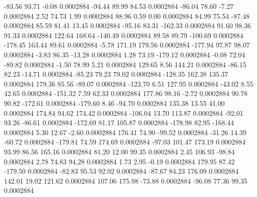       -83.56       93.71       -0.08     0.0002884
      -94.44       89.99       84.53     0.0002884
      -86.04       78.60       -7.27     0.0002884
        2.52       74.73        1.99     0.0002884
       88.96        0.59        0.00     0.0002884
       84.99       75.54      -87.48     0.0002884
       85.59       81.41       13.45     0.0002884
      -95.16       83.31     -162.33     0.0002884
       91.60       98.36       91.33     0.0002884
      122.64      168.64     -140.49     0.0002884
       89.58       89.79     -100.69     0.0002884
     -178.45      163.44       89.61     0.0002884
       -5.78      171.19      179.56     0.0002884
     -177.94       97.87       98.07     0.0002884
       -3.83       86.35      -13.28     0.0002884
        1.28       73.19     -179.12     0.0002884
       -0.08       72.04      -89.82     0.0002884
       -1.50       78.99        5.21     0.0002884
      129.65        8.56      144.21     0.0002884
      -86.15       82.23      -14.71     0.0002884
      -85.23       79.23       79.02     0.0002884
     -128.35      162.38      135.37     0.0002884
      179.36       85.56      -89.07     0.0002884
     -123.70        6.51      127.95     0.0002884
      -43.02        8.55       42.65     0.0002884
     -151.32        7.59       62.33     0.0002884
      177.86       98.16       -2.72     0.0002884
       90.78       90.82     -172.61     0.0002884
     -179.60        8.46      -94.70     0.0002884
      135.38       13.55       41.00     0.0002884
      174.84       94.62      174.42     0.0002884
     -106.04       13.70      113.87     0.0002884
      -92.01       93.26      -86.61     0.0002884
     -172.69       81.17      105.87     0.0002884
     -178.98       82.95     -168.44     0.0002884
        5.30       12.67       -2.60     0.0002884
      176.41       74.90      -99.52     0.0002884
      -31.26       14.39      -60.72     0.0002884
     -179.81       74.59      174.69     0.0002884
      -97.03      101.47      173.19     0.0002884
       93.99       86.56      165.16     0.0002884
       81.20       12.00       99.35     0.0002884
        2.45      106.93      -98.84     0.0002884
        2.78       74.83       94.28     0.0002884
        1.73        2.95       -0.19     0.0002884
      179.95       87.42     -179.50     0.0002884
      -82.83       95.53       92.02     0.0002884
      -87.67       84.23      176.09     0.0002884
      142.01       19.02      121.62     0.0002884
      107.06      175.98      -73.88     0.0002884
      -96.08       77.36       99.35     0.0002884
